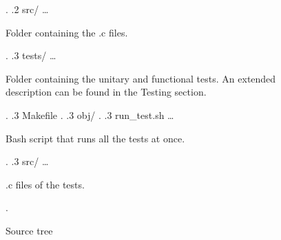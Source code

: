 \begin{figure}[H]
{\begin{minipage}[t]{10cm}
            \end{minipage}.
.2 src/ \hspace{1.85cm} \ldots{}
             \begin{minipage}[t]{10cm}
                Folder containing the {.}c files{.}
            \end{minipage}.
.3 tests/ \hspace{1cm} \ldots{}
             \begin{minipage}[t]{10cm}
                Folder containing the unitary and functional tests{.} An extended description can be found in the Testing section{.}
            \end{minipage}.
.3 Makefile .
.3 obj/ .
.3 run\_test.sh \hspace{0.05cm} \ldots{}
             \begin{minipage}[t]{10cm}
                Bash script that runs all the tests at once{.}
            \end{minipage}.
.3 src/ \hspace{1.35cm} \ldots{}
             \begin{minipage}[t]{10cm}
                {.}c files of the tests{.}
            \end{minipage}.
}
\caption{Source tree}
\end{figure}


